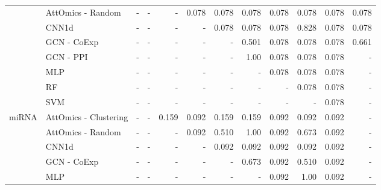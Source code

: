 \begin{sidewaystable}
\begin{tabular}{llrrrrrrrrrr}
		                       & AttOmics - Random     & -             & -                    & -                 & 0.078 & 0.078       & 0.078    & 0.078 & 0.078    & 0.078    & 0.078     \\
		                       & CNN1d                 & -             & -                    & -                 & -     & 0.078       & 0.078    & 0.078 & 0.828    & 0.078    & 0.078     \\
		                       & GCN - CoExp           & -             & -                    & -                 & -     & -           & 0.501    & 0.078 & 0.078    & 0.078    & 0.661     \\
		                       & GCN - PPI             & -             & -                    & -                 & -     & -           & 1.00     & 0.078 & 0.078    & 0.078    & -         \\
		                       & MLP                   & -             & -                    & -                 & -     & -           & -        & 0.078 & 0.078    & 0.078    & -         \\
		                       & RF                    & -             & -                    & -                 & -     & -           & -        & -     & 0.078    & 0.078    & -         \\
		                       & SVM                   & -             & -                    & -                 & -     & -           & -        & -     & -        & 0.078    & -         \\
		\midrule
		\multirow{7}{*}{miRNA} & AttOmics - Clustering & -             & -                    & 0.159             & 0.092 & 0.159       & 0.159    & 0.092 & 0.092    & 0.092    & -         \\
		                       & AttOmics - Random     & -             & -                    & -                 & 0.092 & 0.510       & 1.00     & 0.092 & 0.673    & 0.092    & -         \\
		                       & CNN1d                 & -             & -                    & -                 & -     & 0.092       & 0.092    & 0.092 & 0.092    & 0.092    & -         \\
		                       & GCN - CoExp           & -             & -                    & -                 & -     & -           & 0.673    & 0.092 & 0.510    & 0.092    & -         \\
		                       & MLP                   & -             & -                    & -                 & -     & -           & -        & 0.092 & 1.00     & 0.092    & -         \\

\end{tabular}
\end{sidewaystable}
